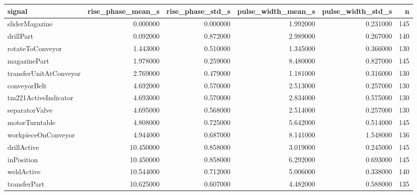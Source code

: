 \begin{tabular}{lrrrrr}
\toprule
signal & rise_phase_mean_s & rise_phase_std_s & pulse_width_mean_s & pulse_width_std_s & n \\
\midrule
sliderMagazine & 0.000000 & 0.000000 & 1.992000 & 0.231000 & 145 \\
drillPart & 0.092000 & 0.872000 & 2.989000 & 0.267000 & 140 \\
rotateToConveyor & 1.443000 & 0.510000 & 1.345000 & 0.366000 & 130 \\
magazinePart & 1.978000 & 0.259000 & 8.480000 & 0.827000 & 145 \\
transferUnitAtConveyor & 2.769000 & 0.479000 & 1.181000 & 0.316000 & 130 \\
conveyorBelt & 4.692000 & 0.570000 & 2.513000 & 0.257000 & 130 \\
tm221ActiveIndicator & 4.693000 & 0.570000 & 2.834000 & 0.575000 & 130 \\
separatorValve & 4.695000 & 0.568000 & 2.514000 & 0.257000 & 130 \\
motorTurntable & 4.808000 & 0.725000 & 5.642000 & 0.514000 & 145 \\
workpieceOnConveyor & 4.944000 & 0.687000 & 8.141000 & 1.548000 & 136 \\
drillActive & 10.450000 & 0.858000 & 3.019000 & 0.245000 & 145 \\
inPosition & 10.450000 & 0.858000 & 6.292000 & 0.693000 & 145 \\
weldActive & 10.544000 & 0.712000 & 5.006000 & 0.338000 & 140 \\
transferPart & 10.625000 & 0.607000 & 4.482000 & 0.588000 & 135 \\
\bottomrule
\end{tabular}
